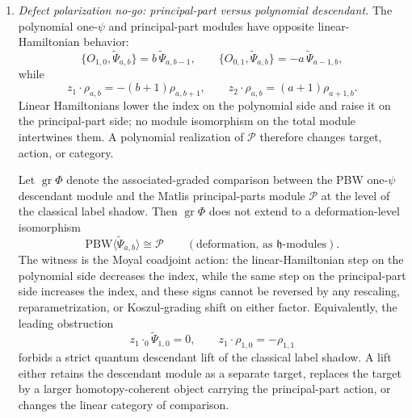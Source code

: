\begin{enumerate}
  \item \emph{Defect polarization no-go: principal-part versus polynomial descendant.}
  The polynomial one-\(\psi\) and principal-part modules have opposite
  linear-Hamiltonian behavior:
  \[
    \{O_{1,0},\widetilde\Psi_{a,b}\}
      =b\,\widetilde\Psi_{a,b-1},
    \qquad
    \{O_{0,1},\widetilde\Psi_{a,b}\}
      =-a\,\widetilde\Psi_{a-1,b},
  \]
  while
  \[
    z_1\cdot\rho_{a,b}=-(b+1)\rho_{a,b+1},
    \qquad
    z_2\cdot\rho_{a,b}=(a+1)\rho_{a+1,b}.
  \]
  Linear Hamiltonians lower the index on the polynomial side and raise
  it on the principal-part side; no module isomorphism on the total
  module intertwines them.  A polynomial realization of \(\mathcal P\)
  therefore changes target, action, or category.

  Let \(\operatorname{gr}\Phi\) denote the associated-graded
  comparison between the PBW one-\(\psi\) descendant module and the
  Matlis principal-parts module \(\mathcal P\) at the level of the
  classical label shadow.  Then \(\operatorname{gr}\Phi\) does not
  extend to a deformation-level isomorphism
  \[
    \mathrm{PBW}\langle\widetilde\Psi_{a,b}\rangle
    \cong
    \mathcal P
    \qquad
    (\text{deformation, as }\mathfrak h\text{-modules}).
  \]
  The witness is the Moyal coadjoint action: the linear-Hamiltonian
  step on the polynomial side decreases the index, while the same step
  on the principal-part side increases the index, and these signs
  cannot be reversed by any rescaling, reparametrization, or
  Koszul-grading shift on either factor.  Equivalently, the leading
  obstruction
  \[
    z_1\cdot_0\widetilde\Psi_{1,0}=0,\qquad
    z_1\cdot\rho_{1,0}=-\rho_{1,1}
  \]
  forbids a strict quantum descendant lift of the classical label
  shadow.  A lift either retains the descendant module as a separate
  target, replaces the target by a larger homotopy-coherent object
  carrying the principal-part action, or changes the linear category
  of comparison.


\end{enumerate}
